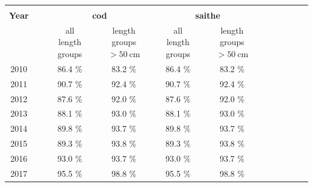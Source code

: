 \documentclass[a4paper 12pt]{article}
\numberwithin{equation}{section}
\begin{document}
\begin{table}[h!]
\centering
\setlength\tabcolsep{1.5pt} 
\begin{tabular}{cccccccccccccccc}
\hline \\
 {\bf Year} &&& \multicolumn{3}{c}{\bf cod} && \multicolumn{3}{c}{\bf saithe}  \\[1.5ex]
  \cmidrule(lr{0.5em}){4-6} \cmidrule(lr{0.5em}){7-10}
&&&all length groups && length groups $  > 50 \ \mathrm{cm}$    && all length groups && length groups $  > 50 \ \mathrm{cm}$    \\[1.5ex]
2010   &&&  86.4 $\%$ && 83.2 $\%$  &&  86.4 $\%$ && 83.2 $\%$    \\[1.5ex]
2011   &&&  90.7 $\%$ && 92.4 $\%$  &&  90.7 $\%$ && 92.4 $\%$ \\[1.5ex]
2012   &&&  87.6 $\%$ && 92.0 $\%$  &&  87.6 $\%$ && 92.0 $\%$  \\[1.5ex]
2013   &&&  88.1 $\%$ && 93.0 $\%$  &&  88.1 $\%$ && 93.0 $\%$   \\[1.5ex]
2014   &&&  89.8 $\%$ && 93.7 $\%$  &&  89.8 $\%$ && 93.7 $\%$   \\[1.5ex]
2015   &&&  89.3 $\%$ && 93.8 $\%$  &&  89.3 $\%$ && 93.8 $\%$   \\[1.5ex]
2016   &&&  93.0 $\%$ && 93.7 $\%$  &&  93.0 $\%$ && 93.7 $\%$   \\[0.5ex]
2017   &&&  95.5 $\%$ && 98.8 $\%$  &&  95.5 $\%$ && 98.8 $\%$   \\[0.5ex]
\hline
\end{tabular}
\end{table}
\end{document}
